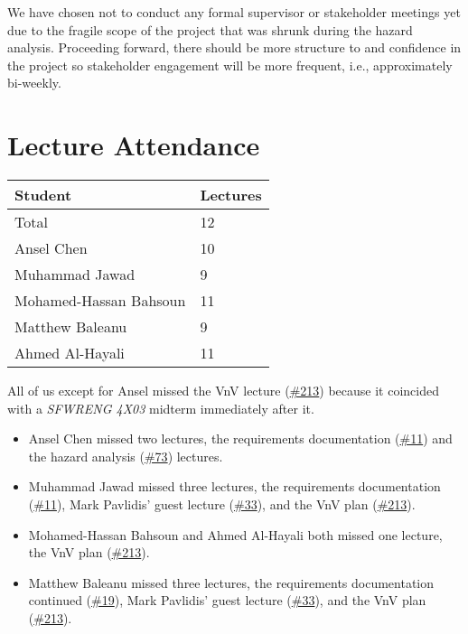 \documentclass{article}
\begin{document}
We have chosen not to conduct any formal supervisor or stakeholder meetings yet due to the fragile scope of the project that was shrunk during the hazard analysis. Proceeding forward, there should be more structure to and confidence in the project so stakeholder engagement will be more frequent, i.e., approximately bi-weekly.

\section{Lecture Attendance}

\begin{table}[H]
\centering
\begin{tabular}{ll}
\toprule
\textbf{Student} & \textbf{Lectures}\\
\midrule
Total & 12\\
Ansel Chen & 10\\
Muhammad Jawad & 9\\
Mohamed-Hassan Bahsoun & 11\\
Matthew Baleanu & 9\\
Ahmed Al-Hayali & 11\\
\bottomrule
\end{tabular}
\end{table}

All of us except for Ansel missed the VnV lecture (\href{https://github.com/AhmedAl-Hayali/GenreGuru/issues/213}{\#213}) because it coincided with a \emph{SFWRENG 4X03} midterm immediately after it.
\begin{itemize}
    \item Ansel Chen missed two lectures, the requirements documentation (\href{https://github.com/AhmedAl-Hayali/GenreGuru/issues/11}{\#11}) and the hazard analysis (\href{https://github.com/AhmedAl-Hayali/GenreGuru/issues/73}{\#73}) lectures.
    \item Muhammad Jawad missed three lectures, the requirements documentation (\href{https://github.com/AhmedAl-Hayali/GenreGuru/issues/11}{\#11}), Mark Pavlidis' guest lecture (\href{https://github.com/AhmedAl-Hayali/GenreGuru/issues/33}{\#33}), and the VnV plan (\href{https://github.com/AhmedAl-Hayali/GenreGuru/issues/213}{\#213}).
    \item Mohamed-Hassan Bahsoun and Ahmed Al-Hayali both missed one lecture, the VnV plan (\href{https://github.com/AhmedAl-Hayali/GenreGuru/issues/213}{\#213}).
    \item Matthew Baleanu missed three lectures, the requirements documentation continued (\href{https://github.com/AhmedAl-Hayali/GenreGuru/issues/19}{\#19}), Mark Pavlidis' guest lecture (\href{https://github.com/AhmedAl-Hayali/GenreGuru/issues/33}{\#33}), and the VnV plan (\href{https://github.com/AhmedAl-Hayali/GenreGuru/issues/213}{\#213}).
\end{itemize}
\end{document}
